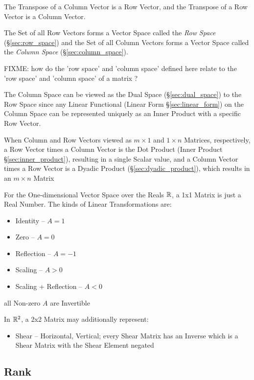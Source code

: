 The Transpose of a Column Vector is a Row Vector, and the Transpose of a Row
Vector is a Column Vector.

The Set of all Row Vectors forms a Vector Space called the \emph{Row Space}
(\S\ref{sec:row_space}) and the Set of all Column Vectors forms a Vector Space
called the \emph{Column Space} (\S\ref{sec:column_space}).

FIXME: how do the 'row space' and 'column space' defined here relate to the
'row space' and 'column space' of a matrix ?

The Column Space can be viewed as the Dual Space (\S\ref{sec:dual_space}) to
the Row Space since any Linear Functional (Linear Form \S\ref{sec:linear_form})
on the Column Space can be represented uniquely as an Inner Product with a
specific Row Vector.

When Column and Row Vectors viewed as $m \times 1$ and $1 \times n$ Matrices,
respectively, a Row Vector times a Column Vector is the Dot Product
(Inner Product \S\ref{sec:inner_product}), resulting in a single Scalar value,
and a Column Vector times a Row Vector is a Dyadic Product
(\S\ref{sec:dyadic_product}), which results in an $m \times n$ Matrix

\asterism

For the One-dimensional Vector Space over the Reals $\mathbb{R}$, a 1x1 Matrix is
just a Real Number. The kinds of Linear Transformations are:
\begin{itemize}
  \item Identity -- $A = 1$
  \item Zero -- $A = 0$
  \item Reflection -- $A = -1$
  \item Scaling -- $A > 0$
  \item Scaling + Reflection -- $A < 0$
\end{itemize}
all Non-zero $A$ are Invertible

In $\mathbb{R}^2$, a 2x2 Matrix may additionally represent:
\begin{itemize}
  \item Shear -- Horizontal, Vertical; every Shear Matrix has an Inverse which
    is a Shear Matrix with the Shear Element negated
\end{itemize}



\subsection{Rank}\label{sec:rank}

